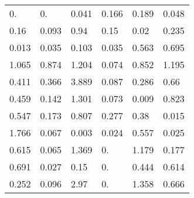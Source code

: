 \begin{tabular}{|llllll|}
\color[HTML]{909090}0. & \color[HTML]{909090}0. & \color[HTML]{808080}0.041 & \color[HTML]{606060}0.166 & \color[HTML]{505050}0.189 & \color[HTML]{808080}0.048 \\ 
\color[HTML]{606060}0.16 & \color[HTML]{707070}0.093 & \color[HTML]{000000}0.94 & \color[HTML]{606060}0.15 & \color[HTML]{909090}0.02 & \color[HTML]{404040}0.235 \\ 
\color[HTML]{909090}0.013 & \color[HTML]{808080}0.035 & \color[HTML]{707070}0.103 & \color[HTML]{808080}0.035 & \color[HTML]{000000}0.563 & \color[HTML]{000000}0.695 \\ 
\color[HTML]{000000}1.065 & \color[HTML]{000000}0.874 & \color[HTML]{000000}1.204 & \color[HTML]{808080}0.074 & \color[HTML]{000000}0.852 & \color[HTML]{000000}1.195 \\ 
\color[HTML]{101010}0.411 & \color[HTML]{202020}0.366 & \color[HTML]{000000}3.889 & \color[HTML]{707070}0.087 & \color[HTML]{303030}0.286 & \color[HTML]{000000}0.66 \\ 
\color[HTML]{000000}0.459 & \color[HTML]{606060}0.142 & \color[HTML]{000000}1.301 & \color[HTML]{808080}0.073 & \color[HTML]{909090}0.009 & \color[HTML]{000000}0.823 \\ 
\color[HTML]{000000}0.547 & \color[HTML]{606060}0.173 & \color[HTML]{000000}0.807 & \color[HTML]{303030}0.277 & \color[HTML]{101010}0.38 & \color[HTML]{909090}0.015 \\ 
\color[HTML]{000000}1.766 & \color[HTML]{808080}0.067 & \color[HTML]{909090}0.003 & \color[HTML]{909090}0.024 & \color[HTML]{000000}0.557 & \color[HTML]{909090}0.025 \\ 
\color[HTML]{000000}0.615 & \color[HTML]{808080}0.065 & \color[HTML]{000000}1.369 & \color[HTML]{909090}0. & \color[HTML]{000000}1.179 & \color[HTML]{505050}0.177 \\ 
\color[HTML]{000000}0.691 & \color[HTML]{808080}0.027 & \color[HTML]{606060}0.15 & \color[HTML]{909090}0. & \color[HTML]{000000}0.444 & \color[HTML]{000000}0.614 \\ 
\color[HTML]{404040}0.252 & \color[HTML]{707070}0.096 & \color[HTML]{000000}2.97 & \color[HTML]{909090}0. & \color[HTML]{000000}1.358 & \color[HTML]{000000}0.666
\end{tabular}
